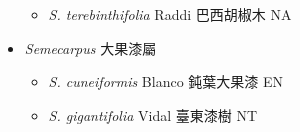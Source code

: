 \begin{itemize}
  \begin{itemize}
        \item[] \textit{S. terebinthifolia} Raddi  巴西胡椒木   NA
  \end{itemize}
 \item[] \textit{Semecarpus} 大果漆屬
                                
  \begin{itemize}
        \item[] \textit{S. cuneiformis} Blanco  鈍葉大果漆   EN
        \item[] \textit{S. gigantifolia} Vidal  臺東漆樹   NT
  \end{itemize}
  \end{itemize}

